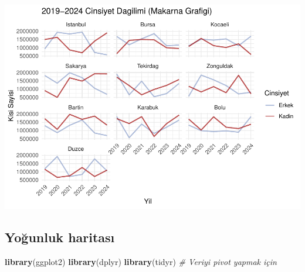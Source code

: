 \documentclass[
]{article}
\newenvironment{Shaded}{\begin{snugshade}}{\end{snugshade}}
\newcommand{\CommentTok}[1]{\textcolor[rgb]{0.56,0.35,0.01}{\textit{#1}}}
\newcommand{\FunctionTok}[1]{\textcolor[rgb]{0.13,0.29,0.53}{\textbf{#1}}}
\newcommand{\NormalTok}[1]{#1}
\begin{document}
\includegraphics{cigdem_ucar_Rmarkdown_odevi_files/figure-latex/unnamed-chunk-11-1.pdf}

\subsection{Yoğunluk haritası}\label{youx11funluk-haritasux131}

\begin{Shaded}
\begin{Highlighting}[]
\FunctionTok{library}\NormalTok{(ggplot2)}
\FunctionTok{library}\NormalTok{(dplyr)}
\FunctionTok{library}\NormalTok{(tidyr) }\CommentTok{\# Veriyi pivot yapmak için}
\end{Highlighting}
\end{Shaded}
\end{document}

